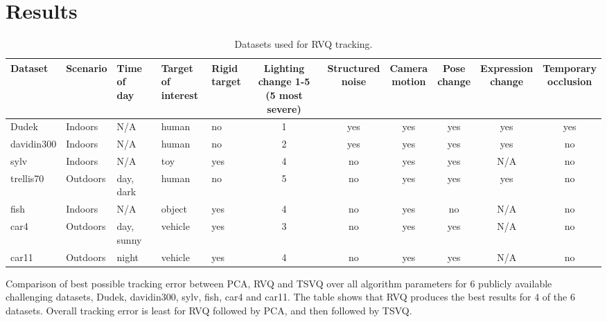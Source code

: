 \section{Results}
\begin{table}[t]
\footnotesize
\begin{tabular}{p{0.6in}|p{0.6in}p{0.6in}p{0.4in}p{0.4in}cccccc}
Dataset 		&Scenario	     &\parbox[c]{0.4in}{\center Time of \\day} 	&\parbox[c]{0.26in}{\center Target of \\interest}  &\parbox{0.3in}{\center Rigid \\target} 	&\parbox{0.4in}{\center Lighting change 1-5 \\(5 most severe)}  	&\parbox{0.5in}{\center Structured \\noise} 	&\parbox{0.4in}{\center Camera \\motion} 	&\parbox{0.3in}{\center Pose \\change} 	&\parbox{0.45in}{\center Expression \\change} 	&\parbox{0.3in}{\center Temporary \\occlusion} 	\\\hline
Dudek 			&Indoors 	     &N/A 			&human 					&no 	&1 	&yes 	&yes 	&yes 	&yes 	&yes 		\\\hline
davidin300 	&Indoors		&N/A			&human					&no	&2	&yes	&yes	&yes	&yes	&no		\\\hline
sylv				&Indoors		&N/A			&toy						&yes	&4	&no	&yes	&yes	&N/A	&no		\\\hline
trellis70	 		&Outdoors 		&day, dark		&human					&no	&5	&no	&yes	&yes	&yes	&no		\\\hline
fish				&Indoors		&N/A			&object					&yes	&4	&no	&yes	&no	&N/A	&no		\\\hline
car4			&Outdoors 		&day, sunny	&vehicle					&yes	&3	&no	&yes	&yes	&N/A	&no		\\\hline
car11			&Outdoors		&night			&vehicle					&yes	&4	&no	&yes	&yes	&N/A	&no		\\\hline
\end{tabular}
\caption{Datasets used for RVQ tracking.}
\label{Tab:datasets_used}
\end{table}


\begin{table}[h!]
\centering

\caption{Comparison of best possible tracking error between PCA, RVQ and TSVQ over all algorithm parameters for 6 publicly available challenging datasets, Dudek, davidin300, sylv, fish, car4 and car11.  The table shows that RVQ produces the best results for 4 of the 6 datasets.  Overall tracking error is least for RVQ followed by PCA, and then followed by TSVQ.}
\end{table}


